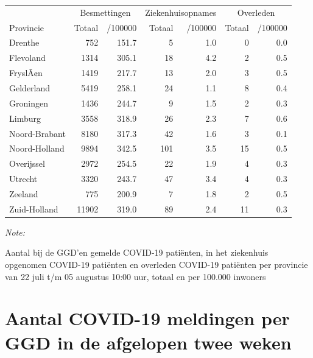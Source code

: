 \documentclass[
  english,
  man,floatsintext]{apa6}
\begin{document}
\begin{table}
\centering
\begin{threeparttable}
\begin{tabular}{lrrrrrr}
\toprule
\multicolumn{1}{c}{ } & \multicolumn{2}{c}{Besmettingen} & \multicolumn{2}{c}{Ziekenhuisopnames} & \multicolumn{2}{c}{Overleden} \\
\cmidrule(l{3pt}r{3pt}){2-3} \cmidrule(l{3pt}r{3pt}){4-5} \cmidrule(l{3pt}r{3pt}){6-7}
Provincie & Totaal & /100000 & Totaal & /100000 & Totaal & /100000\\
\midrule
Drenthe & 752 & 151.7 & 5 & 1.0 & 0 & 0.0\\
Flevoland & 1314 & 305.1 & 18 & 4.2 & 2 & 0.5\\
FryslÃ¢n & 1419 & 217.7 & 13 & 2.0 & 3 & 0.5\\
Gelderland & 5419 & 258.1 & 24 & 1.1 & 8 & 0.4\\
Groningen & 1436 & 244.7 & 9 & 1.5 & 2 & 0.3\\
Limburg & 3558 & 318.9 & 26 & 2.3 & 7 & 0.6\\
Noord-Brabant & 8180 & 317.3 & 42 & 1.6 & 3 & 0.1\\
Noord-Holland & 9894 & 342.5 & 101 & 3.5 & 15 & 0.5\\
Overijssel & 2972 & 254.5 & 22 & 1.9 & 4 & 0.3\\
Utrecht & 3320 & 243.7 & 47 & 3.4 & 4 & 0.3\\
Zeeland & 775 & 200.9 & 7 & 1.8 & 2 & 0.5\\
Zuid-Holland & 11902 & 319.0 & 89 & 2.4 & 11 & 0.3\\
\bottomrule
\end{tabular}
\begin{tablenotes}
\item \textit{Note: } 
\item Aantal bij de GGD’en gemelde COVID-19 patiënten, in het ziekenhuis opgenomen COVID-19 patiënten en overleden COVID-19 patiënten per provincie van 22 juli t/m 05 augustus 10:00 uur, totaal en per 100.000 inwoners
\end{tablenotes}
\end{threeparttable}
\end{table}

\newpage

\hypertarget{aantal-covid-19-meldingen-per-ggd-in-de-afgelopen-twee-weken}{%
\section{Aantal COVID-19 meldingen per GGD in de afgelopen twee weken}\label{aantal-covid-19-meldingen-per-ggd-in-de-afgelopen-twee-weken}}
\end{document}
